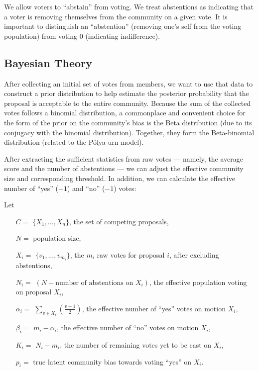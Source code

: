 \documentclass[chi_draft]{sigchi}
\begin{document}
We allow voters to ``abstain'' from voting.
We treat abstentions as indicating that a voter is removing themselves from the community on a given vote.
It is important to distinguish an ``abstention'' (removing one's self from the voting population) from voting $0$ (indicating indifference).

\subsection{Bayesian Theory}
After collecting an initial set of votes from members, we want to use that data to construct a prior distribution to help estimate the posterior probability that the proposal is acceptable to the entire community.  Because the sum of  the collected votes follows a binomial distribution, a commonplace and convenient choice for the form of the prior on the community's bias is the Beta distribution (due to its conjugacy with the binomial distribution).  Together, they form the Beta-binomial distribution (related to the P\'olya urn model).

After extracting the sufficient statistics from raw votes --- namely, the average score and the number of abstentions --- we can adjust the effective community size and corresponding threshold.  In addition, we can calculate the effective number of ``yes'' ($+1$) and ``no'' ($-1$) votes:

Let
\begin{description}
\begin{itemize}
\item[$C = $] $\{X_1,\ldots, X_n\}$, the set of competing proposals,
\item[$N = $] population size,
\item[$X_i = $] $\{v_1, \ldots, v_{m_i}\}$, the $m_i$ raw votes for proposal $i$, after excluding abstentions,
\item[$N_i = $] $(N - \textrm{number of abstentions on } X_i)$, the effective population voting on proposal $X_i$,
\item[$\alpha_i = $] $\sum\limits_{v \in X_i}\left(\frac{v+1}{2}\right)$, the effective number of ``yes'' votes on motion $X_i$,
\item[$\beta_i = $] $m_i - \alpha_i$, the effective number of ``no'' votes on motion $X_i$,
\item[$K_i = $] $N_i - m_i$, the number of remaining votes yet to be cast on $X_i$,
\item[$p_i = $] true latent community bias towards voting ``yes'' on $X_i$.
\end{itemize}
\end{description}
\end{document}
